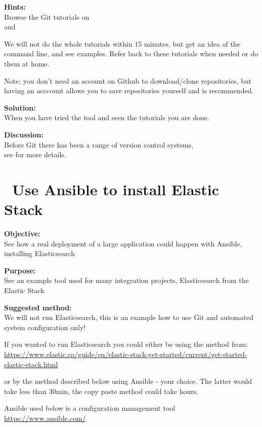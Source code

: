 \documentclass[a4paper,11pt,notitlepage]{report}
\begin{document}
{\bf Hints:}\\
Browse the Git tutorials on \\
and 

We will not do the whole tutorials within 15 minutes, but get an idea of the command line, and see examples. Refer back to these tutorials when needed or do them at home.

Note: you don't need an account on Github to download/clone repositories, but having an acccount allows you to save repositories yourself and is recommended.

{\bf Solution:}\\
When you have tried the tool and seen the tutorials you are done.

{\bf Discussion:}\\
Before Git there has been a range of version control systems,\\
see  for more details.




\chapter{\faInfoCircle\ Use Ansible to install Elastic Stack}
\label{ex:basicansible}


{\bf Objective:}\\
See how a real deployment of a large application could happen with Ansible, installing Elasticsearch

{\bf Purpose:}\\
See an example tool used for many integration projects, Elasticsearch from the Elastic Stack

{\bf Suggested method:}\\
We will not run Elasticsearch, this is an example how to use Git and automated system configuration only!

If you wanted to run Elasticsearch you could either be using the method from:\\{\footnotesize
\url{https://www.elastic.co/guide/en/elastic-stack-get-started/current/get-started-elastic-stack.html}}

or by the method described below using Ansible - your choice. The latter would take less than 30min, the copy paste method could take hours.

Ansible used below is a configuration management tool \url{https://www.ansible.com/}
\end{document}
